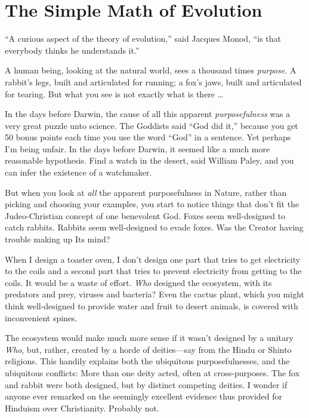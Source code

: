 \myendsectiontext

\chapter{The Simple Math of Evolution}


{
 ``A curious aspect of the theory of
evolution,'' said Jacques Monod,
``is that everybody thinks he understands
it.'' }

{
 A human being, looking at the natural world, sees a thousand times
\textit{purpose.} A rabbit's legs, built and
articulated for running; a fox's jaws, built and
articulated for tearing. But what you see is not exactly what is there
\ldots}

{
 In the days before Darwin, the cause of all this apparent
\textit{purposefulness} was a very great puzzle unto science. The
Goddists said ``God did it,''
because you get 50 bonus points each time you use the word
``God'' in a sentence. Yet perhaps
I'm being unfair. In the days before Darwin, it seemed
like a much more reasonable hypothesis. Find a watch in the desert,
said William Paley, and you can infer the existence of a watchmaker.}

{
 But when you look at \textit{all} the apparent purposefulness in
Nature, rather than picking and choosing your examples, you start to
notice things that don't fit the Judeo-Christian
concept of one benevolent God. Foxes seem well-designed to catch
rabbits. Rabbits seem well-designed to evade foxes. Was the Creator
having trouble making up Its mind?}

{
 When I design a toaster oven, I don't design one
part that tries to get electricity to the coils and a second part that
tries to prevent electricity from getting to the coils. It would be a
waste of effort. \textit{Who} designed the ecosystem, with its
predators and prey, viruses and bacteria? Even the cactus plant, which
you might think well-designed to provide water and fruit to desert
animals, is covered with inconvenient spines.}

{
 The ecosystem would make much more sense if it
wasn't designed by a unitary \textit{Who}, but, rather,
created by a horde of deities---say from the Hindu or Shinto religions.
This handily explains both the ubiquitous purposefulnesses, and the
ubiquitous conflicts: More than one deity acted, often at
cross-purposes. The fox and rabbit were both designed, but by distinct
competing deities. I wonder if anyone ever remarked on the seemingly
excellent evidence thus provided for Hinduism over Christianity.
Probably not.}

